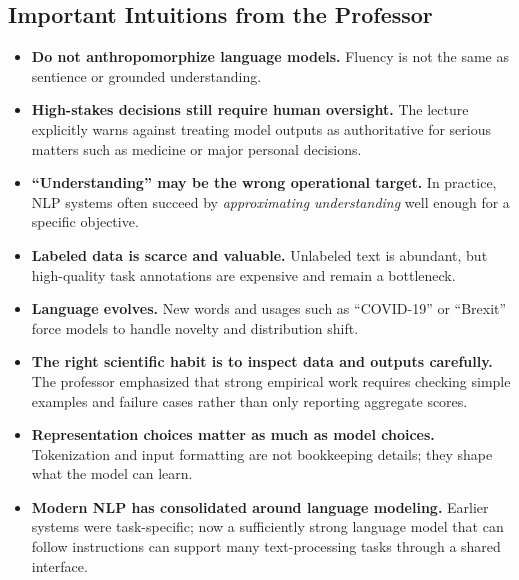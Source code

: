 \documentclass[11pt]{article}
\begin{document}
\subsection{Important Intuitions from the Professor}
\begin{itemize}
    \item \textbf{Do not anthropomorphize language models.} Fluency is not the same as sentience or grounded understanding.
    \item \textbf{High-stakes decisions still require human oversight.} The lecture explicitly warns against treating model outputs as authoritative for serious matters such as medicine or major personal decisions.
    \item \textbf{``Understanding'' may be the wrong operational target.} In practice, NLP systems often succeed by \emph{approximating understanding} well enough for a specific objective.
    \item \textbf{Labeled data is scarce and valuable.} Unlabeled text is abundant, but high-quality task annotations are expensive and remain a bottleneck.
    \item \textbf{Language evolves.} New words and usages such as ``COVID-19'' or ``Brexit'' force models to handle novelty and distribution shift.
    \item \textbf{The right scientific habit is to inspect data and outputs carefully.} The professor emphasized that strong empirical work requires checking simple examples and failure cases rather than only reporting aggregate scores.
    \item \textbf{Representation choices matter as much as model choices.} Tokenization and input formatting are not bookkeeping details; they shape what the model can learn.
    \item \textbf{Modern NLP has consolidated around language modeling.} Earlier systems were task-specific; now a sufficiently strong language model that can follow instructions can support many text-processing tasks through a shared interface.
\end{itemize}
\end{document}
